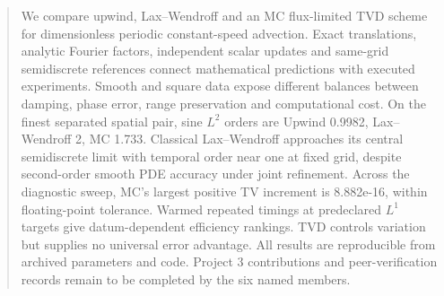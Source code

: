 \documentclass[11pt,a4paper]{article}
\begin{document}
\begin{abstract}
We compare upwind, Lax--Wendroff and an MC flux-limited TVD scheme for dimensionless periodic constant-speed advection. Exact translations, analytic Fourier factors, independent scalar updates and same-grid semidiscrete references connect mathematical predictions with executed experiments. Smooth and square data expose different balances between damping, phase error, range preservation and computational cost. On the finest separated spatial pair, sine $L^2$ orders are Upwind 0.9982, Lax--Wendroff 2, MC 1.733. Classical Lax--Wendroff approaches its central semidiscrete limit with temporal order near one at fixed grid, despite second-order smooth PDE accuracy under joint refinement. Across the diagnostic sweep, MC's largest positive TV increment is 8.882e-16, within floating-point tolerance. Warmed repeated timings at predeclared $L^1$ targets give datum-dependent efficiency rankings. TVD controls variation but supplies no universal error advantage. All results are reproducible from archived parameters and code. Project 3 contributions and peer-verification records remain to be completed by the six named members.
\end{abstract}\clearpage\tableofcontents\clearpage{}
\end{document}
